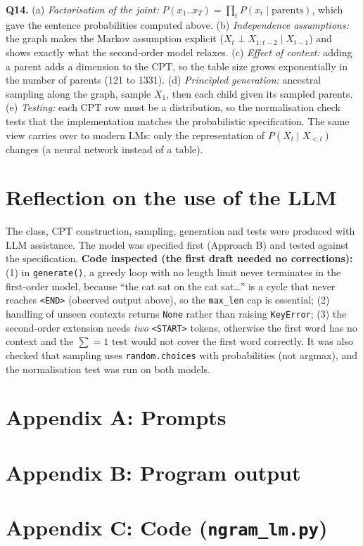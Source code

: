 \documentclass[10pt,a4paper]{article}
\begin{document}
\textbf{Q14.} (a) \emph{Factorisation of the joint:} $P(x_1..x_T)=\prod_tP(x_t\mid\text{parents})$, which gave the sentence probabilities computed above. (b) \emph{Independence assumptions:} the graph makes the Markov assumption explicit ($X_t\perp X_{1:t-2}\mid X_{t-1}$) and shows exactly what the second-order model relaxes. (c) \emph{Effect of context:} adding a parent adds a dimension to the CPT, so the table size grows exponentially in the number of parents (121 to 1331). (d) \emph{Principled generation:} ancestral sampling along the graph, sample $X_1$, then each child given its sampled parents. (e) \emph{Testing:} each CPT row must be a distribution, so the normalisation check tests that the implementation matches the probabilistic specification. The same view carries over to modern LMs: only the representation of $P(X_t\mid X_{<t})$ changes (a neural network instead of a table).

\section*{Reflection on the use of the LLM}
The class, CPT construction, sampling, generation and tests were produced with LLM assistance. The model was specified first (Approach B) and tested against the specification. \textbf{Code inspected (the first draft needed no corrections):} (1) in \texttt{generate()}, a greedy loop with no length limit never terminates in the first-order model, because ``the cat sat on the cat sat\dots'' is a cycle that never reaches \texttt{<END>} (observed output above), so the \texttt{max\_len} cap is essential; (2) handling of unseen contexts returns \texttt{None} rather than raising \texttt{KeyError}; (3) the second-order extension needs \emph{two} \texttt{<START>} tokens, otherwise the first word has no context and the $\sum=1$ test would not cover the first word correctly. It was also checked that sampling uses \texttt{random.choices} with probabilities (not argmax), and the normalisation test was run on both models.

\section*{Appendix A: Prompts}
\section*{Appendix B: Program output}
\section*{Appendix C: Code (\texttt{ngram\_lm.py})}
\end{document}
